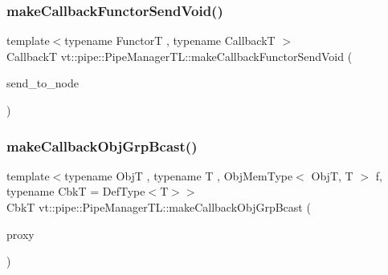 \subsubsection{\texorpdfstring{make\+Callback\+Functor\+Send\+Void()}{makeCallbackFunctorSendVoid()}\hspace{0.1cm}{\footnotesize\ttfamily [2/2]}}
{\footnotesize\ttfamily template$<$typename FunctorT , typename CallbackT $>$ \\
CallbackT vt\+::pipe\+::\+Pipe\+Manager\+T\+L\+::make\+Callback\+Functor\+Send\+Void (\begin{DoxyParamCaption}\item[{\hyperlink{namespacevt_a866da9d0efc19c0a1ce79e9e492f47e2}{Node\+Type} const \&}]{send\+\_\+to\+\_\+node }\end{DoxyParamCaption})}

\mbox{\label{structvt_1_1pipe_1_1_pipe_manager_t_l_a8a4da1e38acd018f847aa9fddae44956}} 
\subsubsection{\texorpdfstring{make\+Callback\+Obj\+Grp\+Bcast()}{makeCallbackObjGrpBcast()}\hspace{0.1cm}{\footnotesize\ttfamily [1/2]}}
{\footnotesize\ttfamily template$<$typename ObjT , typename T , Obj\+Mem\+Type$<$ Obj\+T, T $>$ f, typename CbkT  = Def\+Type$<$\+T$>$$>$ \\
CbkT vt\+::pipe\+::\+Pipe\+Manager\+T\+L\+::make\+Callback\+Obj\+Grp\+Bcast (\begin{DoxyParamCaption}\item[{\hyperlink{structvt_1_1objgroup_1_1proxy_1_1_proxy}{objgroup\+::proxy\+::\+Proxy}$<$ ObjT $>$}]{proxy }\end{DoxyParamCaption})}

\mbox{\label{structvt_1_1pipe_1_1_pipe_manager_t_l_a9caf63b8c6577acd4884933c1b9cc886}} 
